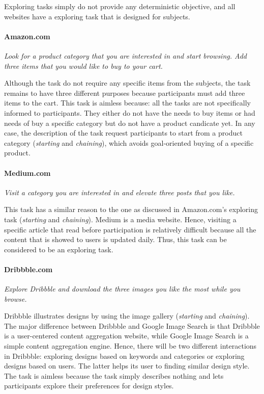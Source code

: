 Exploring tasks simply do not provide any deterministic objective,
and all websites have a exploring task that is designed for subjects.

\paragraph{Amazon.com} \emph{Look for a product category that you are interested in and start browsing. 
        Add three items that you would like to buy to your cart.}

Although the task do not require any specific items from the subjects, 
the task remains to have three different purposes because participants must 
add three items to the cart. This task is aimless because: 
all the tasks are not specifically informed to participants. 
They either do not have the needs to buy items or 
had needs of buy a specific category but do not have a product candicate yet.
In any case, the description of the task request participants to start from a product category (\emph{starting} and \emph{chaining}), 
which avoids goal-oriented buying of a specific product.

\paragraph{Medium.com} \emph{Visit a category you are interested in and elevate 
three posts that you like.}

This task has a similar reason to the one as discussed in Amazon.com's exploring task (\emph{starting} and \emph{chaining}). 
Medium is a media website. Hence, visiting a specific article that read before participation is relatively difficult 
because all the content that is showed to users is updated daily. 
Thus, this task can be considered to be an exploring task.

\paragraph{Dribbble.com} \emph{Explore Dribbble and download the three images 
you like the most while you browse.}

Dribbble illustrates designs by using the image gallery (\emph{starting} and \emph{chaining}). 
The major difference between Dribbble and Google Image Search
is that Dribbble is a user-centered content aggregation website, while Google Image Search 
is a simple content aggregation engine.
Hence, there will be two different interactions in Dribbble: exploring designs based on 
keywords and categories or exploring designs based on users. 
The latter helps its user to finding similar design style.
The task is aimless because the task simply describes nothing and lets participants explore 
their preferences for design styles.

